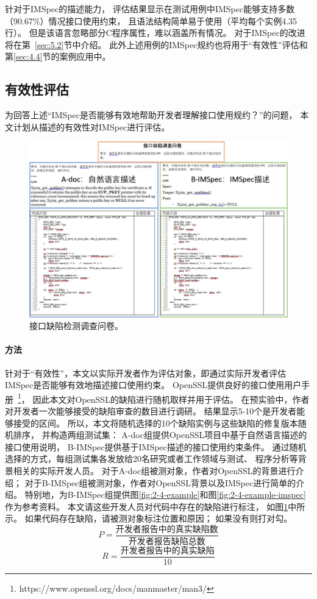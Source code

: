 针对于IMSpec的描述能力，
评估结果显示在测试用例中IMSpec能够支持多数（90.67\%）情况接口使用约束，
且语法结构简单易于使用（平均每个实例4.35行）。
但是该语言忽略部分C程序属性，难以涵盖所有情况。
对于IMSpec的改进将在第~\ref{sec:5.2}节中介绍。
此外上述用例的IMSpec规约也将用于“有效性”评估和第\ref{sec:4.4}节的案例应用中。


\subsection{有效性评估}
为回答上述“IMSpec是否能够有效地帮助开发者理解接口使用规约？”的问题，
本文计划从描述的有效性对IMSpec进行评估。

\begin{figure}[b]
	\centering
	\includegraphics[width=0.85\linewidth]{figures/cp2-survey.png}
	\caption{
		接口缺陷检测调查问卷。
	}
	\label{fig:2-5-survey}
\end{figure}

\paragraph{方法}
针对于“有效性”，本文以实际开发者作为评估对象，即通过实际开发者评估IMSpec是否能够有效地描述接口使用约束。
OpenSSL提供良好的接口使用用户手册~\footnote{https://www.openssl.org/docs/manmaster/man3/}，
因此本文对OpenSSL的缺陷进行随机取样并用于评估。
在预实验中，作者对开发者一次能够接受的缺陷审查的数目进行调研。
结果显示5-10个是开发者能够接受的区间。
所以，本文将随机选择的10个缺陷实例与这些缺陷的修复版本随机排序，
并构造两组测试集：
A-doc组提供OpenSSL项目中基于自然语言描述的接口使用说明，
B-IMSpec提供基于IMSpec描述的接口使用约束条件。
通过随机选择的方式，每组测试集各发放给20名研究或者工作领域与测试、
程序分析等背景相关的实际开发人员。
对于A-doc组被测对象，作者对OpenSSL的背景进行介绍；
对于B-IMSpec组被测对象，作者对OpenSSL背景以及IMSpec进行简单的介绍。
特别地，为B-IMSpec组提供图\ref{fig:2-4-example}和图\ref{fig:2-4-example-imspec}作为参考资料。
本文请这些开发人员对代码中存在的缺陷进行标注，
如图\ref{fig:2-5-survey}中所示。
如果代码存在缺陷，请被测对象标注位置和原因；
如果没有则打对勾。
\begin{equation}
\label{eq:p}
P = \dfrac{\text{开发者报告中的真实缺陷数}}{\text{开发者报告缺陷总数}}
\end{equation}
\begin{equation}
\label{eq:r}
R = \dfrac{\text{开发者报告中的真实缺陷}}{10}
\end{equation}


